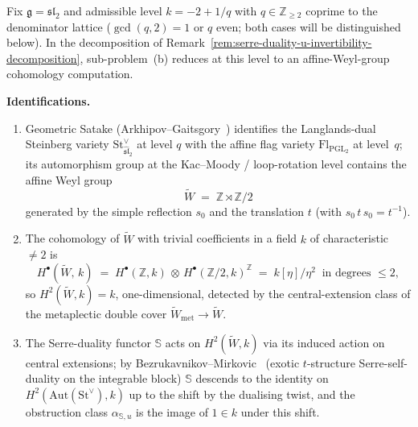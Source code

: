 \begin{proposition}
\label{prop:alpha-su-sl2-admissible}
%
%
%
Fix $\mathfrak{g} = \mathfrak{sl}_2$ and admissible level
$k = -2 + 1/q$ with $q \in \mathbb{Z}_{\geq 2}$ coprime to the
denominator lattice ($\gcd(q,2) = 1$ or $q$ even; both cases will be
distinguished below). In the decomposition of
Remark~\textup{\ref{rem:serre-duality-u-invertibility-decomposition}},
sub-problem~\textup{(b)} reduces at this level to an affine-Weyl-group
cohomology computation.

\medskip
\noindent\textbf{Identifications.}
\begin{enumerate}[label=\textup{(\roman*)}]
\item Geometric Satake
(Arkhipov--Gaitsgory~\cite{ArkhipovGaitsgory09}) identifies the
Langlands-dual Steinberg variety
$\mathrm{St}^{\vee}_{\widehat{\mathfrak{sl}}_2}$ at level $q$ with the
affine flag variety $\mathrm{Fl}_{\mathrm{PGL}_2}$ at level~$q$; its
automorphism group at the
Kac--Moody / loop-rotation level contains the affine Weyl group
\[
\widetilde{W} \;=\; \mathbb{Z}\rtimes\mathbb{Z}/2
\]
generated by the simple reflection $s_0$ and the translation $t$
(with $s_0\, t\, s_0 = t^{-1}$).
\item The cohomology of $\widetilde{W}$ with trivial coefficients in
a field $k$ of characteristic $\neq 2$ is
\[
H^\bullet(\widetilde{W},\,k) \;=\;
H^\bullet(\mathbb{Z},k)\,\otimes\,H^\bullet(\mathbb{Z}/2,k)^{\mathbb{Z}}
\;=\; k[\eta]/\eta^2\ \text{ in degrees }\le 2,
\]
so $H^2(\widetilde{W},k) = k$, one-dimensional, detected by the
central-extension class of the metaplectic double cover
$\widetilde{W}_{\mathrm{met}} \to \widetilde{W}$.
\item The Serre-duality functor $\mathbb{S}$ acts on
$H^2(\widetilde{W},k)$ via its induced action on central extensions;
by Bezrukavnikov--Mirkovic~\cite{Bezrukavnikov16} (exotic
$t$-structure Serre-self-duality on the integrable block)
$\mathbb{S}$ descends to the identity on
$H^2(\mathrm{Aut}(\mathrm{St}^{\vee}),k)$ up to the shift by the
dualising twist, and the obstruction class $\alpha_{\mathbb{S},u}$
is the image of $1\in k$ under this shift.
\end{enumerate}


\end{proposition}
